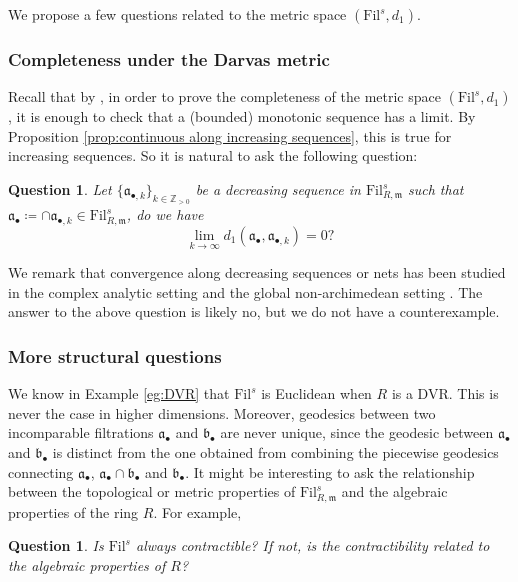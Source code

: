 \documentclass[11pt, leqno]{amsart}%
\theoremstyle{plain}
\newtheorem{question}[theorem]{Question}
\theoremstyle{definition}
\theoremstyle{remark}
\newcommand{\bZ}{\mathbb{Z}}
\newcommand{\fa}{\mathfrak{a}}
\newcommand{\fb}{\mathfrak{b}}
\newcommand{\fm}{\mathfrak{m}}
\newcommand{\Fil}{\mathrm{Fil}}
\numberwithin{equation}{section}
\begin{document}
We propose a few questions related to the metric space $(\Fil^s,d_1)$.

\subsubsection{Completeness under the Darvas metric}\label{ssec:completeness}

Recall that by \cite{Xia19}, in order to prove the completeness of the metric space $(\Fil^s,d_1)$, it is enough to check that a (bounded) monotonic sequence has a limit. By Proposition \ref{prop:continuous along increasing sequences}, this is true for increasing sequences. So it is natural to ask the following question:

\begin{question}\label{q:continuity along decreasing nets}
    Let $\{\fa_{\bullet,k}\}_{k\in\bZ_{>0}}$ be a decreasing sequence in $\Fil^s_{R,\fm}$ such that $\fa_\bullet\coloneqq\cap \fa_{\bullet,k}\in\Fil^s_{R,\fm}$,
    do we have 
    \[
	\lim_{k\to\infty} d_1(\fa_\bullet,\fa_{\bullet,k})=0?
    \]
\end{question}

We remark that convergence along decreasing sequences or nets has been studied in the complex analytic setting \cite[Proposition 6.11]{Dar17} and the global non-archimedean setting \cite[Theorem 12.5]{BJ22}. The answer to the above question is likely no, but we do not have a counterexample. 







\subsubsection{More structural questions}

We know in Example \ref{eg:DVR} that $\Fil^s$ is Euclidean when $R$ is a DVR. This is never the case in higher dimensions. Moreover, geodesics between two incomparable filtrations $\fa_\bullet$ and $\fb_\bullet$ are never unique, since the geodesic between $\fa_\bullet$ and $\fb_\bullet$ is distinct from the one obtained from combining the piecewise geodesics connecting $\fa_\bullet$, $\fa_\bullet\cap\fb_\bullet$ and $\fb_\bullet$. It might be interesting to ask the relationship between the topological or metric properties of $\Fil^s_{R,\fm}$ and the algebraic properties of the ring $R$. For example,

\begin{question}
    Is $\Fil^s$ always contractible? If not, is the contractibility related to the algebraic properties of $R$?
\end{question}
\end{document}
